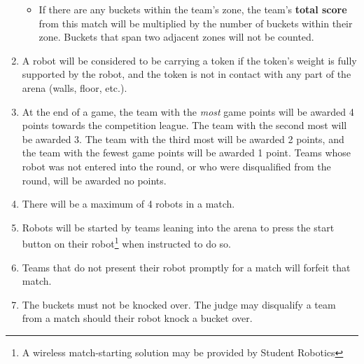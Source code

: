 \begin{enumerate}
\begin{itemize}
  \item If there are any buckets within the team's zone, the team's \textbf{total score} from this match will be multiplied by the number of buckets within their zone.  Buckets that span two adjacent zones will not be counted.

\end{itemize}

\item A robot will be considered to be carrying a token if the token's weight is fully supported by the robot, and the token is not in contact with any part of the arena (walls, floor, etc.).

\item At the end of a game, the team with the \emph{most} game points will be awarded 4 points towards the competition league.
 The team with the second most will be awarded 3.
 The team with the third most will be awarded 2 points, and the team with the fewest game points will be awarded 1 point.
 Teams whose robot was not entered into the round, or who were disqualified from the round, will be awarded no points.

\item There will be a maximum of 4 robots in a match.
\item Robots will be started by teams leaning into the arena to press the start button on their robot\footnote{A wireless match-starting solution may be provided by Student Robotics} when instructed to do so.

\item Teams that do not present their robot promptly for a match will forfeit that match.

\item The buckets must not be knocked over.  The judge may disqualify a team from a match should their robot knock a bucket over.
\end{enumerate}

